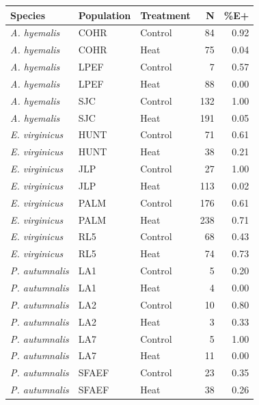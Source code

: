 \begin{tabular}{lllrr}
  \hline
Species & Population & Treatment & N & \%E+ \\ 
  \hline
\textit{A. hyemalis} & COHR & Control &  84 & 0.92 \\ 
  \textit{A. hyemalis} & COHR & Heat &  75 & 0.04 \\ 
  \textit{A. hyemalis} & LPEF & Control &   7 & 0.57 \\ 
  \textit{A. hyemalis} & LPEF & Heat &  88 & 0.00 \\ 
  \textit{A. hyemalis} & SJC & Control & 132 & 1.00 \\ 
  \textit{A. hyemalis} & SJC & Heat & 191 & 0.05 \\ 
  \textit{E. virginicus} & HUNT & Control &  71 & 0.61 \\ 
  \textit{E. virginicus} & HUNT & Heat &  38 & 0.21 \\ 
  \textit{E. virginicus} & JLP & Control &  27 & 1.00 \\ 
  \textit{E. virginicus} & JLP & Heat & 113 & 0.02 \\ 
  \textit{E. virginicus} & PALM & Control & 176 & 0.61 \\ 
  \textit{E. virginicus} & PALM & Heat & 238 & 0.71 \\ 
  \textit{E. virginicus} & RL5 & Control &  68 & 0.43 \\ 
  \textit{E. virginicus} & RL5 & Heat &  74 & 0.73 \\ 
  \textit{P. autumnalis} & LA1 & Control &   5 & 0.20 \\ 
  \textit{P. autumnalis} & LA1 & Heat &   4 & 0.00 \\ 
  \textit{P. autumnalis} & LA2 & Control &  10 & 0.80 \\ 
  \textit{P. autumnalis} & LA2 & Heat &   3 & 0.33 \\ 
  \textit{P. autumnalis} & LA7 & Control &   5 & 1.00 \\ 
  \textit{P. autumnalis} & LA7 & Heat &  11 & 0.00 \\ 
  \textit{P. autumnalis} & SFAEF & Control &  23 & 0.35 \\ 
  \textit{P. autumnalis} & SFAEF & Heat &  38 & 0.26 \\ 
   \hline
\end{tabular}

